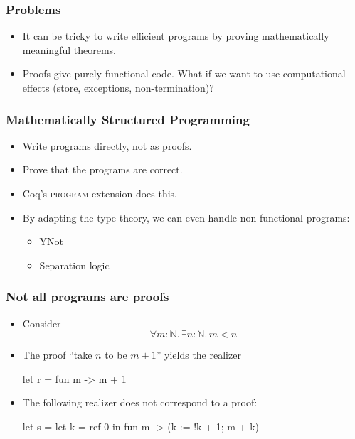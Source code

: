 \documentclass[t]{beamer}
\newcommand{\NN}{\mathbb{N}}
\begin{document}
\begin{frame}
  \frametitle{Problems}

  \begin{itemize}
  \item It can be tricky to write efficient programs by proving
    mathematically meaningful theorems.
  \item Proofs give purely functional code. What if we want to use
    computational effects (store, exceptions, non-termination)?
  \end{itemize}

\end{frame}

\begin{frame}
  \frametitle{Mathematically Structured Programming}

  \begin{itemize}
  \item Write programs directly, not as proofs.
  \item Prove that the programs are correct.
  \item Coq's \textsc{program} extension does this.
  \item By adapting the type theory, we can even handle non-functional
    programs:
    \begin{itemize}
    \item YNot
    \item Separation logic
    \end{itemize}
  \end{itemize}
\end{frame}


\begin{frame}[fragile]
  \frametitle{Not all programs are proofs}

  \begin{itemize}
  \item Consider
    \begin{equation*}
      \forall m : \NN .\, \exists n : \NN .\, m < n
    \end{equation*}
  \item The proof ``take $n$ to be $m+1$'' yields the realizer
\begin{source}
  let r = fun m -> m + 1      
\end{source}
  \item The following realizer does not correspond to a proof:
\begin{source}
  let s =
    let k = ref 0 in
      fun m -> (k := !k + 1; m + k)
\end{source}
    \end{itemize}
\end{frame}
\end{document}
